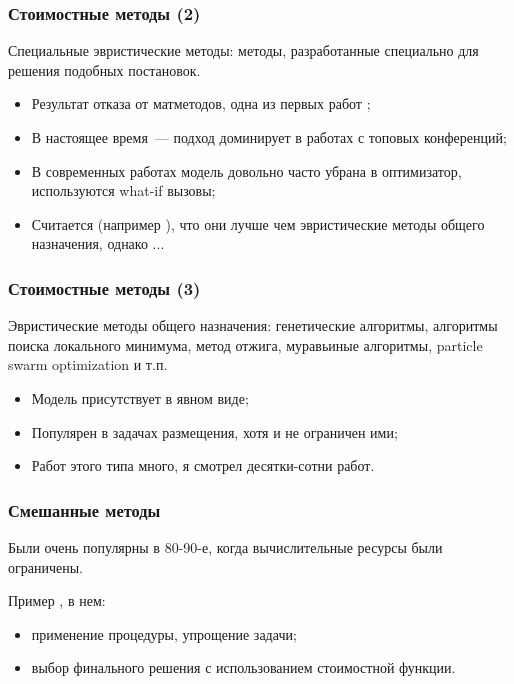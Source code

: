 \documentclass[unicode]{beamer}
\begin{document}
\begin{frame}
\frametitle{Стоимостные методы (2)}
Специальные эвристические методы: методы, разработанные специально для решения подобных постановок.
\begin{itemize}
  \setlength\itemsep{1em}	
  \item Результат отказа от матметодов, одна из первых работ \cite{p13};
  \item В настоящее время~--- подход доминирует в работах с топовых конференций;
  \item В современных работах модель довольно часто убрана в оптимизатор, используются what-if вызовы;    
  \item Считается (например \cite{p10}), что они лучше чем эвристические методы общего назначения, однако \alert{...}
\end{itemize}

\end{frame}

\begin{frame}
\frametitle{Стоимостные методы (3)}

Эвристические методы общего назначения: генетические алгоритмы, алгоритмы поиска локального минимума, метод отжига, муравьиные алгоритмы, particle swarm optimization и т.п.
\begin{itemize}
  \setlength\itemsep{1em}	
  \item Модель присутствует в явном виде;
  \item Популярен в задачах размещения, хотя и не ограничен ими;
  \item Работ этого типа \alert{много}, я смотрел десятки-сотни работ.
\end{itemize}

\end{frame}

\begin{frame}
\frametitle{Смешанные методы}

Были очень популярны в 80-90-е, когда вычислительные ресурсы были ограничены.

Пример \cite{p11}, в нем:

\begin{itemize}
  \item применение процедуры, упрощение задачи;
  \item выбор финального решения с использованием стоимостной функции.
\end{itemize}
  

\end{frame}
\end{document}
